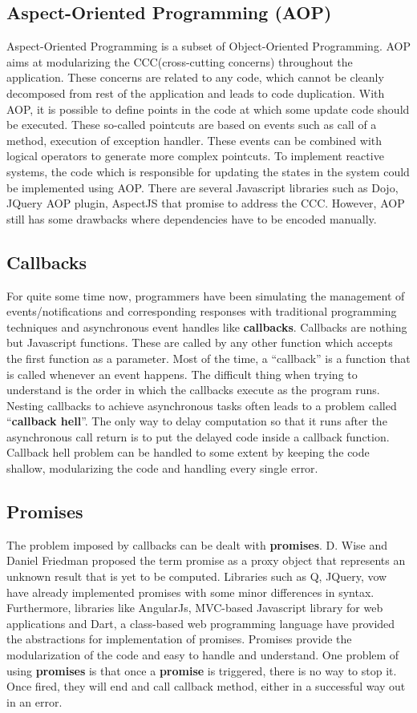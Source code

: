 \subsection{Aspect-Oriented Programming (AOP)}
Aspect-Oriented Programming is a subset of Object-Oriented Programming. 
AOP aims at modularizing the CCC(cross-cutting concerns) throughout the application. 
These concerns are related to any code, which cannot be cleanly decomposed from rest of the application and leads to code duplication. 
With AOP, it is possible to define points in the code at which some update code should be executed. 
These so-called pointcuts are based on events such as call of a method, execution of exception handler. 
These events can be combined with logical operators to generate more complex pointcuts. 
To implement reactive systems, the code which is responsible for updating the states in the system could be implemented using AOP. There are several Javascript libraries such as Dojo, JQuery AOP plugin, AspectJS that promise to address the CCC. 
However, AOP still has some drawbacks where dependencies have to be encoded manually.
\subsection{Callbacks}
For quite some time now, programmers have been simulating the management of events/notifications and corresponding responses with traditional programming techniques and asynchronous event handles like \textbf{callbacks}. 
Callbacks are nothing but Javascript functions. 
These are called by any other function which accepts the first function as a parameter. 
Most of the time, a ``callback'' is a function that is called whenever an event happens. 
The difficult thing when trying to understand is the order in which the callbacks execute as the program runs. 
Nesting callbacks to achieve asynchronous tasks often leads to a problem called ``\textbf{callback hell}''\cite{callbackHell}. 
The only way to delay computation so that it runs after the asynchronous call return is to put the delayed code inside a callback function.
Callback hell problem can be handled to some extent by keeping the code shallow, modularizing the code and handling every single error. 

\subsection{Promises}
The problem imposed by callbacks can be dealt with \textbf{promises}. D. Wise and Daniel Friedman\cite{promiseKeyword} proposed the term promise as a proxy object that represents an unknown result that is yet to be computed. 
Libraries such as Q, JQuery, vow have already implemented promises with some minor differences in syntax.
Furthermore, libraries like AngularJs\cite{angularjs}, MVC-based Javascript library for web applications and Dart, a class-based web programming language have provided the abstractions for implementation of promises. 
Promises provide the modularization of the code and easy to handle and understand. 
One problem of using \textbf{promises} is that once a \textbf{promise} is triggered, there is no way to stop it. 
Once fired, they will end and call callback method, either in a successful way out in an error.


